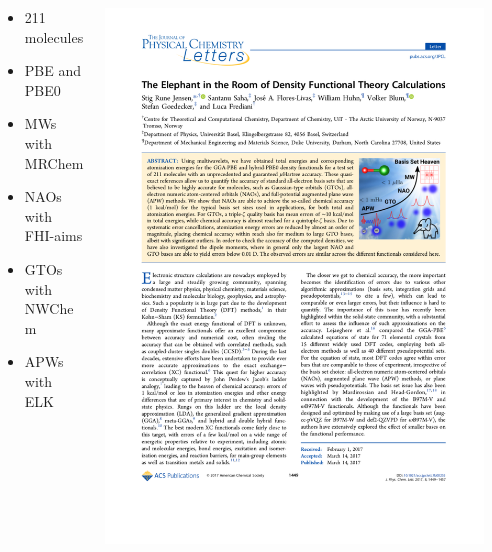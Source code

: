 \begin{frame}
    \begin{columns}
    \begin{column}[b]{0.02\linewidth}
    \end{column}
    \begin{column}[b]{0.50\linewidth}
        \begin{itemize}
            \item 211 molecules
            \item PBE and PBE0
        \end{itemize}
        \begin{itemize}
            \item MWs with MRChem
            \item NAOs with FHI-aims
            \item GTOs with NWChem
            \item APWs with ELK
        \end{itemize}
        \vspace{5mm}
    \end{column}
    \begin{column}[b]{0.45\linewidth}
	\includegraphics[scale=1.00, clip, viewport = 400 480 525 605]{figures/elephant_room.pdf}
    \end{column}
    \end{columns}
\end{frame}

